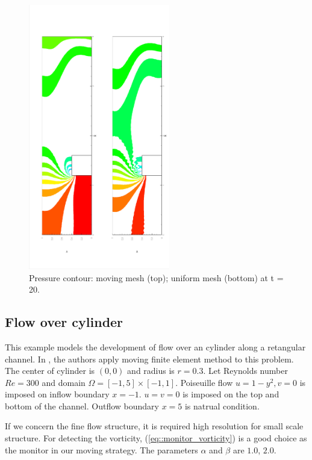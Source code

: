 \documentclass[mathpazo]{aamm}
\begin{document}
      \begin{figure}[!htbp]
        \centering
        \includegraphics[width = 0.55\textwidth, angle = -90]{picture/step_flow_data/pressure_contour.eps}
        \caption{\small Pressure contour: moving mesh (top); uniform
          mesh (bottom) at t = 20.}
        \label{fig::step_flow_pressure_contour_20s}
      \end{figure}

   \subsection{Flow over cylinder}
   
      This example models the development of flow over an cylinder
      along a retangular channel. In \cite{cao1999anr}, the authors
      apply moving finite element method to this problem. The center
      of cylinder is $(0, 0)$ and radius is $r = 0.3$. Let Reynolds 
      number $Re = 300$ and domain $\Omega = [-1, 5] \times [-1, 1]$. 
      Poiseuille flow $u = 1 - y^2, v = 0$ is imposed on inflow
      boundary $x = -1$. $u = v = 0$ is imposed on the top and bottom
      of the channel. Outflow boundary $x = 5$ is natrual
      condition. 

      If we concern the fine flow structure, it is required
      high resolution for small scale structure. For detecting the
      vorticity, (\ref{eq::monitor_vorticity}) is a good choice as the
      monitor in our moving strategy. The parameters $\alpha$ and
      $\beta$ are $1.0$, $2.0$. 
\end{document}
